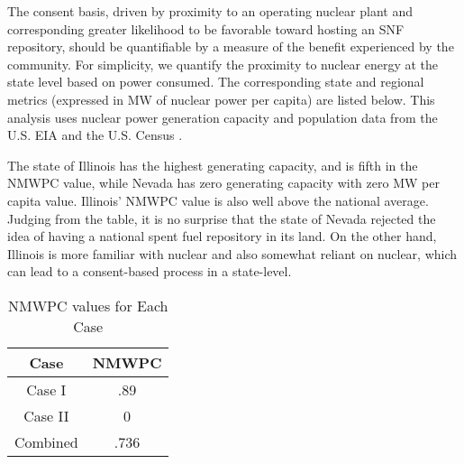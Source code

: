 The consent basis, driven by proximity to an operating nuclear plant and 
corresponding greater likelihood to be favorable toward hosting an \gls{SNF} 
repository, should be quantifiable by a measure of the benefit experienced by 
the community.  For simplicity, we quantify the proximity to nuclear energy at 
the state level  based on power consumed. The corresponding state and regional 
metrics (expressed in MW of nuclear power per capita) are listed below. This 
analysis uses nuclear power generation capacity and population data from the 
U.S. \gls{EIA} \cite{eia_state_2012} and the U.S. Census \cite{census}.  

\begin{table}[h]
	
	\centering
	\caption {\gls{NMWPC} values for different states}

	\end{table}
	
	
The state of Illinois has the highest generating capacity, and is fifth in the \gls{NMWPC}
 value, while Nevada has zero generating capacity with zero MW per capita value. 
Illinois' \gls{NMWPC} value is also well above the national average. Judging from the
table, it is no surprise that the state of Nevada rejected the idea of having a national
spent fuel repository in its land. On the other hand, Illinois is more familiar with 
nuclear and also somewhat reliant on nuclear, which can lead to a consent-based process
in a state-level. 

\begin{table}[h]
	
	\centering
	\caption {\gls{NMWPC} values for Each Case}

		\begin{tabular}{|c|c|}
			\hline
			Case & NMWPC \\
			\hline
			Case I & .89\\
			Case II & 0\\
			Combined & .736 %
			\\
			\hline
                \end{tabular}
\end{table}


